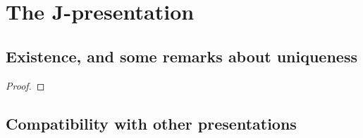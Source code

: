 \section{The J-presentation}
    \subsection{Existence, and some remarks about uniqueness}
        \begin{proposition} \label{prop: J_presentation_for_KM_QUEs_existence}
            
        \end{proposition}
            \begin{proof}
                
            \end{proof}

    \subsection{Compatibility with other presentations}